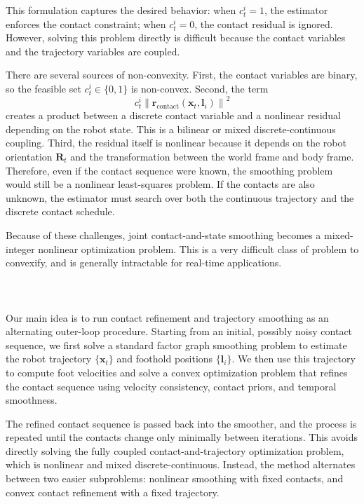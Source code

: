 \documentclass[conference]{IEEEtran}
\begin{document}
This formulation captures the desired behavior: when $c_t^i=1$, the estimator enforces the contact
constraint; when $c_t^i=0$, the contact residual is ignored. However, solving this problem directly is
difficult because the contact variables and the trajectory variables are coupled.

There are several sources of non-convexity. First, the contact variables are binary, so the feasible set
$c_t^i \in \{0,1\}$ is non-convex. Second, the term
\begin{equation}
c_t^i
\left\|
\mathbf{r}_{\text{contact}}(\mathbf{x}_t,\mathbf{l}_i)
\right\|^2
\end{equation}
creates a product between a discrete contact variable and a nonlinear residual depending on the robot
state. This is a bilinear or mixed discrete-continuous coupling. Third, the residual itself is nonlinear
because it depends on the robot orientation $\mathbf{R}_t$ and the transformation between the world frame
and body frame. Therefore, even if the contact sequence were known, the smoothing problem would still be
a nonlinear least-squares problem. If the contacts are also unknown, the estimator must search over both
the continuous trajectory and the discrete contact schedule.


Because of these challenges, joint contact-and-state smoothing becomes a mixed-integer nonlinear
optimization problem. This is a very difficult class of problem to convexify, and is generally intractable for real-time applications.\\
\\
\\
\\




Our main idea is to run contact refinement and trajectory smoothing as an alternating outer-loop procedure. 
Starting from an initial, possibly noisy contact sequence, we first solve a standard factor graph smoothing problem to estimate the robot trajectory $\{\mathbf{x}_t\}$ and foothold positions $\{\mathbf{l}_i\}$. 
We then use this trajectory to compute foot velocities and solve a convex optimization problem that refines the contact sequence using velocity consistency, contact priors, and temporal smoothness.

The refined contact sequence is passed back into the smoother, and the process is repeated until the contacts change only minimally between iterations. 
This avoids directly solving the fully coupled contact-and-trajectory optimization problem, which is nonlinear and mixed discrete-continuous. 
Instead, the method alternates between two easier subproblems: nonlinear smoothing with fixed contacts, and convex contact refinement with a fixed trajectory.
\end{document}
